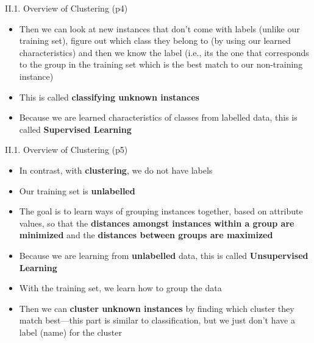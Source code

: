 \documentclass[handout]{beamer}
\newcommand{\strong}[1]{\textbf{\color{teal} #1}}
\newcommand{\stronger}[1]{\textbf{\color{purple} #1}}
\begin{document}
\begin{frame}{II.1. Overview of Clustering (p4)}
\begin{itemize}
\item Then we can look at new instances that don't come with labels (unlike our training set), figure out which class they belong to (by using our learned characteristics) and then we know the label (i.e., its the one that corresponds to the group in the training set which is the best match to our non-training instance)
\item This is called \strong{classifying unknown instances}
\item Because we are learned characteristics of classes from labelled data, this is called \stronger{Supervised Learning}
\end{itemize}
\end{frame}
\begin{frame}{II.1. Overview of Clustering (p5)}
\begin{itemize}
\item In contrast, with \stronger{clustering}, we do not have labels
\item Our training set is \strong{unlabelled}
\item The goal is to learn ways of grouping instances together, based on attribute values, so that the \strong{distances amongst instances within a group are minimized} and the \strong{distances between groups are maximized}
\item Because we are learning from \strong{unlabelled} data, this is called \stronger{Unsupervised Learning}
\item With the training set, we learn how to group the data
\item Then we can \strong{cluster unknown instances} by finding which cluster they match best---this part is similar to classification, but we just don't have a label (name) for the cluster
\end{itemize}
\end{frame}
\end{document}
